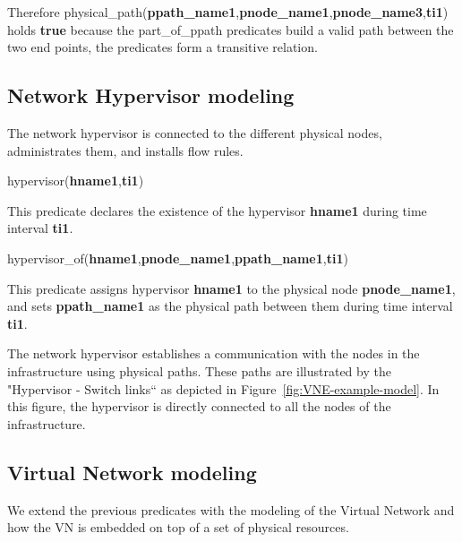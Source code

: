 Therefore physical\_path(\textbf{ppath\_name1},\textbf{pnode\_name1},\textbf{pnode\_name3},\textbf{ti1}) holds \textbf{true} because the part\_of\_ppath predicates build a valid path between the two end points, \eg the predicates form a transitive relation. 









\subsection{Network Hypervisor modeling}
The network hypervisor is connected to the different physical nodes, administrates them, and  installs flow rules.

\begin{myformula}
hypervisor(\textbf{hname1},\textbf{ti1})
\end{myformula}

This predicate declares the existence of the hypervisor \textbf{hname1} during time interval \textbf{ti1}.

\begin{myformula}
hypervisor\_of(\textbf{hname1},\textbf{pnode\_name1},\textbf{ppath\_name1},\textbf{ti1})
\end{myformula}

This predicate assigns hypervisor \textbf{hname1} to the physical node \textbf{pnode\_name1}, and sets \textbf{ppath\_name1} as the physical path between them during time interval \textbf{ti1}.

The network hypervisor establishes a communication with the nodes in the infrastructure using physical paths.
These paths are illustrated by the "Hypervisor - Switch links`` as depicted in Figure~\ref{fig:VNE-example-model}.
In this figure, the hypervisor is directly connected to all the nodes of the infrastructure.



\subsection{Virtual Network modeling}
We extend the previous predicates with the modeling of the Virtual Network and how the VN is embedded on top of a set of physical resources.

